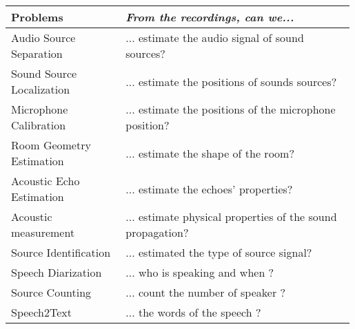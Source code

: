 \begin{tabular}{p{0.33\linewidth} p{0.66\linewidth}}
    \toprule
    Problems & \textit{From the recordings, can we...} \\
    \midrule
    Audio Source Separation   & ... estimate the audio signal of sound sources?\\

    Sound Source Localization & ... estimate the positions of sounds sources? \\

    Microphone Calibration    & ... estimate the positions of the microphone position? \\

    Room Geometry Estimation  & ... estimate the shape of the room? \\

    Acoustic Echo Estimation  & ... estimate the echoes' properties? \\

    Acoustic measurement      & ... estimate physical properties of the sound propagation?\\

    \hline
    Source Identification     & ... estimated the type of source signal?\\

    Speech Diarization        & ... who is speaking and when ? \\

    Source Counting           & ... count the number of speaker ? \\

    Speech2Text               & ... the words of the speech ? \\

    \bottomrule
\end{tabular}